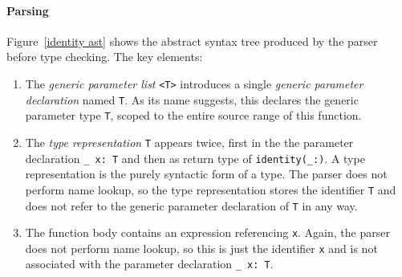 \documentclass[a4paper,headsepline,bibliography=totoc,toc=flat,fleqn,twoside=semi]{scrbook}
\theoremstyle{definition}
\theoremstyle{definition}
\theoremstyle{definition}
\begin{document}
\paragraph{Parsing} Figure~\ref{identity ast} shows the abstract syntax tree produced by the parser before type checking. The key elements:
\begin{enumerate}
\item The \emph{generic parameter list} \texttt{<T>} introduces a single \emph{generic parameter declaration} named \texttt{T}. As its name suggests, this declares the generic parameter type \texttt{T}, scoped to the entire source range of this function.
\item The \emph{type representation} \texttt{T} appears twice, first in the the parameter declaration \verb|_ x: T| and then as return type of \verb|identity(_:)|. A type representation is the purely syntactic form of a type. The parser does not perform name lookup, so the type representation stores the identifier \texttt{T} and does not refer to the generic parameter declaration of \texttt{T} in any way.
\item The function body contains an expression referencing \texttt{x}. Again, the parser does not perform name lookup, so this is just the identifier \texttt{x} and is not associated with the parameter declaration \verb|_ x: T|.
\end{enumerate}

\end{document}
